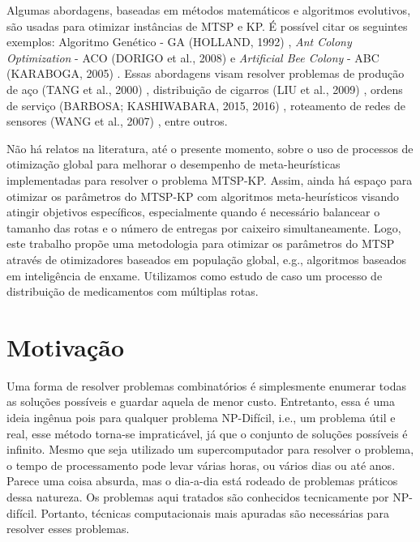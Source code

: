 Algumas abordagens, baseadas em métodos matemáticos e algoritmos evolutivos, são usadas para otimizar instâncias de MTSP e KP. É possível citar os seguintes exemplos: Algoritmo Genético - GA (HOLLAND, 1992) \cite{holland1992genetic}, \textit{Ant Colony Optimization} - ACO (DORIGO et al., 2008) \cite{dorigo2008particle} e \textit{Artificial Bee Colony} - ABC (KARABOGA, 2005) \cite{karaboga2005idea}. Essas abordagens visam resolver problemas de produção de aço (TANG et al., 2000) \cite{tang2000multiple}, distribuição de cigarros (LIU et al., 2009) \cite{liu2009ant}, ordens de serviço (BARBOSA; KASHIWABARA, 2015, 2016) \cite{barbosa2015aplicaccao, barbosa2016aplicaccao}, roteamento de redes de sensores (WANG et al., 2007) \cite{wang2007hierarchical}, entre outros.

Não há relatos na literatura, até o presente momento, sobre o uso de processos de otimização global para melhorar o desempenho de meta-heurísticas implementadas para resolver o problema MTSP-KP. Assim, ainda há espaço para otimizar os parâmetros do MTSP-KP com algoritmos meta-heurísticos visando atingir objetivos específicos, especialmente quando é necessário balancear o tamanho das rotas e o número de entregas por caixeiro simultaneamente. Logo, este trabalho propõe uma metodologia para otimizar os parâmetros do MTSP através de otimizadores baseados em população global, e.g., algoritmos baseados em inteligência de enxame. Utilizamos como estudo de caso um processo de distribuição de medicamentos com múltiplas rotas.

\section{Motivação}
\label{sec-motivacao}

Uma forma de resolver problemas combinatórios é simplesmente enumerar todas as soluções possíveis e guardar aquela de menor custo. Entretanto, essa é uma ideia ingênua pois para qualquer problema NP-Difícil, i.e., um problema útil e real, esse método torna-se impraticável, já que o conjunto de soluções possíveis é infinito. Mesmo que seja utilizado um supercomputador para resolver o problema, o tempo de processamento pode levar várias horas, ou vários dias ou até anos. Parece uma coisa absurda, mas o dia-a-dia está rodeado de problemas práticos dessa natureza. Os problemas aqui tratados são conhecidos tecnicamente por NP-difícil. Portanto, técnicas computacionais mais apuradas são necessárias para resolver esses problemas.

